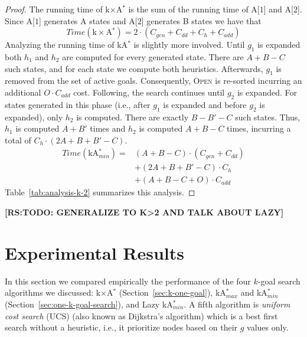 \documentclass{aicom2e}
\newcommand{\kgs}{$k$-goal search}
\newcommand{\astar}{A$^*$}
\newcommand{\kastar}{kA$^*$}
\newcommand{\kastarmin}{kA$^*_{min}$}
\newcommand{\kastarmax}{kA$^*_{max}$}
\newcommand{\kxastar}{k$\times$A$^*$}
\newcommand{\astari}[1]{A[$#1$]}
\newcommand{\minf}{Min-f}
\newcommand{\open}{\textsc{Open}}
\newcommand{\roni}[1]{\textbf{[RS:#1]}}
\begin{document}
\begin{proof}
	
	The running time of \kxastar{} is the sum of the running time of \astari{1} and \astari{2}. 
	Since \astari{1} generates A states and \astari{2} generates B states we have that 
	\[ Time(\text{\kxastar{}})=2\cdot(C_{gen}+C_{dd}+C_{h}+C_{add}) \]
	Analyzing the running time of \kastar{} is slightly more involved. Until $g_1$ is expanded
	both $h_1$ and $h_2$ are computed for every generated state. 
	There are $A+B-C$ such states, and for each state we compute both heuristics. 
	Afterwards, $g_1$ is removed from the set of active goals. 
	Consequently, \open{} is re-sorted incurring an additional $O\cdot C_{add}$ cost. 
	Following, the search continues until $g_2$ is expanded. 
	For states generated in this phase (i.e., after $g_1$ is expanded and before $g_2$ is expanded), 
	only $h_2$ is computed. There are exactly $B-B'-C$ such states. 
	Thus, $h_1$ is computed $A+B'$ times and $h_2$ is computed 
	$A+B-C$ times, incurring a total of $C_h\cdot (2A+B+B'-C)$. 
	\begin{align*}
		Time(\text{\kastarmin{}})=&(A+B-C)\cdot (C_{gen}+C_{dd})\\
				&+ (2A+B+B'-C)\cdot C_h\\
				&+ (A+B-C+O)\cdot C_{add}	
	\end{align*}
	Table~\ref{tab:analysis-k-2} summarizes this analysis. 	
\end{proof}




\roni{TODO: GENERALIZE TO K>2 AND TALK ABOUT LAZY}

\section{Experimental Results}



In this section we compared empirically the performance of the four \kgs{}
algorithms we discussed: 
\kxastar{} (Section~\ref{sec:k-one-goal}), 
\kastarmax{} and \kastarmin{}(Section~\ref{sec:one-k-goal-search}),  
and Lazy \kastarmin{}. A fifth algorithm is {\em uniform cost search} (UCS) (also known
as Dijkstra's algorithm) which is a best first search without a heuristic,
i.e., it prioritize nodes based on their $g$ values only.
\end{document}
